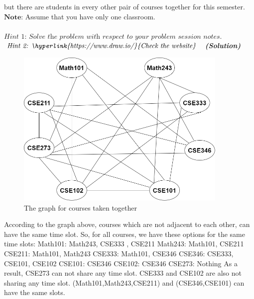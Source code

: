 \documentclass[a4 paper]{article}
\numberwithin{equation}{section}
\newcommand{\solution}{~\newline\textbf{\textit{(Solution)}} }
\newcommand{\0}{\mathbf{0}}
\begin{document}
but there are students in every other pair of courses together for this semester.\\ 
$\textbf{Note:}$ Assume that you have only one classroom.\\ \\
$\textit{Hint 1: Solve the problem with respect to your problem session notes.}$\\
$\textit{Hint 2: \hyperlink{https://www.draw.io/}{Check the website}}$
\newline
\solution
\newline
\begin{figure}[h]
	\centering
	\includegraphics[height=3in]{g1.png}
	\caption{The graph for courses taken together}
	\label{fig:G1a}
\end{figure}
\newline
According to the graph above, courses which are not adjacent to each other, can have the same time slot. So, for all courses, we have these options for the same time slots:
\newline \newline
Math101: Math243, CSE333 , CSE211\newline
Math243: Math101, CSE211 \newline
CSE211: Math101, Math243\newline
CSE333: Math101, CSE346\newline
CSE346: CSE333, CSE101, CSE102\newline
CSE101: CSE346\newline
CSE102: CSE346\newline
CSE273: Nothing\newline
\newpage
As a result, CSE273 can not share any time slot. CSE333 and CSE102 are also not sharing any time slot. (Math101,Math243,CSE211) and (CSE346,CSE101) can have the same slots.
\end{document}
